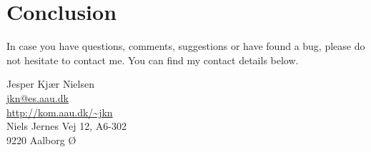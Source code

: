 {}
\chapter*{Conclusion} %


In case you have questions, comments, suggestions or have found a bug, please do not hesitate to contact me. You can find my contact details below.
  \begin{center}
    Jesper Kjær Nielsen\\
    \href{mailto: jkn@es.aau.dk}{jkn@es.aau.dk}\\
    \href{http://kom.aau.dk/~jkn}{http://kom.aau.dk/\textasciitilde jkn}\\
    Niels Jernes Vej 12, A6-302\\
    9220 Aalborg Ø
  \end{center}
 
